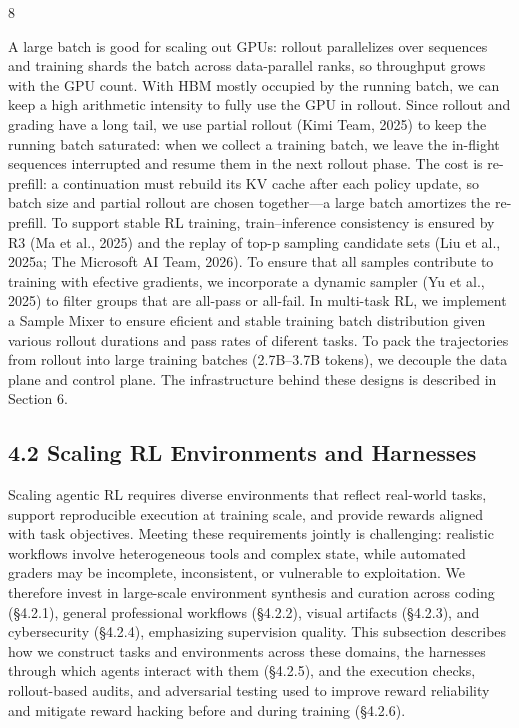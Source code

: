 \documentclass[
  10
]{article}
\begin{document}
8

A large batch is good for scaling out GPUs: rollout parallelizes over
sequences and training shards the batch across data-parallel ranks, so
throughput grows with the GPU count. With HBM mostly occupied by the
running batch, we can keep a high arithmetic intensity to fully use the
GPU in rollout. Since rollout and grading have a long tail, we use
partial rollout (Kimi Team, 2025) to keep the running batch saturated:
when we collect a training batch, we leave the in-flight sequences
interrupted and resume them in the next rollout phase. The cost is
re-prefill: a continuation must rebuild its KV cache after each policy
update, so batch size and partial rollout are chosen together---a large
batch amortizes the re-prefill. To support stable RL training,
train--inference consistency is ensured by R3 (Ma et al., 2025) and the
replay of top-p sampling candidate sets (Liu et al., 2025a; The
Microsoft AI Team, 2026). To ensure that all samples contribute to
training with efective gradients, we incorporate a dynamic sampler (Yu
et al., 2025) to filter groups that are all-pass or all-fail. In
multi-task RL, we implement a Sample Mixer to ensure eficient and stable
training batch distribution given various rollout durations and pass
rates of diferent tasks. To pack the trajectories from rollout into
large training batches (2.7B--3.7B tokens), we decouple the data plane
and control plane. The infrastructure behind these designs is described
in Section 6.

\subsection{4.2 Scaling RL Environments and
Harnesses}\label{scaling-rl-environments-and-harnesses}

Scaling agentic RL requires diverse environments that reflect real-world
tasks, support reproducible execution at training scale, and provide
rewards aligned with task objectives. Meeting these requirements jointly
is challenging: realistic workflows involve heterogeneous tools and
complex state, while automated graders may be incomplete, inconsistent,
or vulnerable to exploitation. We therefore invest in large-scale
environment synthesis and curation across coding (§4.2.1), general
professional workflows (§4.2.2), visual artifacts (§4.2.3), and
cybersecurity (§4.2.4), emphasizing supervision quality. This subsection
describes how we construct tasks and environments across these domains,
the harnesses through which agents interact with them (§4.2.5), and the
execution checks, rollout-based audits, and adversarial testing used to
improve reward reliability and mitigate reward hacking before and during
training (§4.2.6).
\end{document}
